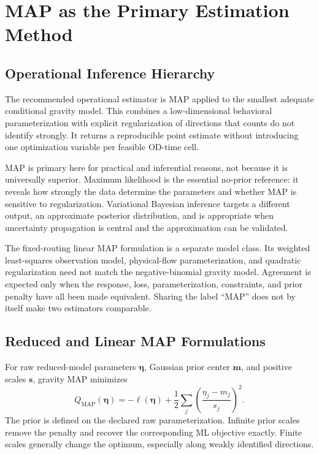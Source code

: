 
\section{MAP as the Primary Estimation Method}
\subsection{Operational Inference Hierarchy}

The recommended operational estimator is MAP applied to the smallest adequate
conditional gravity model. This combines a low-dimensional behavioral
parameterization with explicit regularization of directions that counts do not
identify strongly. It returns a reproducible point estimate without introducing
one optimization variable per feasible OD-time cell.

MAP is primary here for practical and inferential reasons, not because it is
universally superior. Maximum likelihood is the essential no-prior reference:
it reveals how strongly the data determine the parameters and whether MAP is
sensitive to regularization. Variational Bayesian inference targets a different
output, an approximate posterior distribution, and is appropriate when
uncertainty propagation is central and the approximation can be validated.

The fixed-routing linear MAP formulation is a separate model class. Its
weighted least-squares observation model, physical-flow parameterization, and
quadratic regularization need not match the negative-binomial gravity model.
Agreement is expected only when the response, loss, parameterization,
constraints, and prior penalty have all been made equivalent. Sharing the label
``MAP'' does not by itself make two estimators comparable.

\subsection{Reduced and Linear MAP Formulations}

For raw reduced-model parameters $\bm\eta$, Gaussian prior center $\bm m$, and
positive scales $\bm s$, gravity MAP minimizes
\[
 Q_{\mathrm{MAP}}(\bm\eta)
 =-\ell(\bm\eta)
  +\frac12\sum_j\left(\frac{\eta_j-m_j}{s_j}\right)^2.
\]
The prior is defined on the declared raw parameterization. Infinite prior
scales remove the penalty and recover the corresponding ML objective exactly.
Finite scales generally change the optimum, especially along weakly identified
directions.





